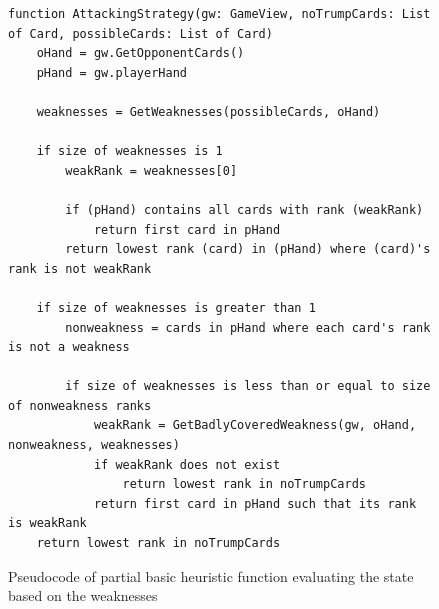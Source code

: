 \begin{figure}[h]
\captionsetup{justification=centering}
\begin{lstlisting}
function AttackingStrategy(gw: GameView, noTrumpCards: List of Card, possibleCards: List of Card)
    oHand = gw.GetOpponentCards()
    pHand = gw.playerHand
    
    weaknesses = GetWeaknesses(possibleCards, oHand)
    
    if size of weaknesses is 1
        weakRank = weaknesses[0]

        if (pHand) contains all cards with rank (weakRank)
            return first card in pHand  
        return lowest rank (card) in (pHand) where (card)'s rank is not weakRank
        		
    if size of weaknesses is greater than 1
        nonweakness = cards in pHand where each card's rank is not a weakness
        
        if size of weaknesses is less than or equal to size of nonweakness ranks
            weakRank = GetBadlyCoveredWeakness(gw, oHand, nonweakness, weaknesses)
            if weakRank does not exist
                return lowest rank in noTrumpCards
            return first card in pHand such that its rank is weakRank
    return lowest rank in noTrumpCards
\end{lstlisting}
\caption{Pseudocode of partial basic heuristic function evaluating the state based on the weaknesses}
\label{fig:BHWeakness}
\end{figure}

